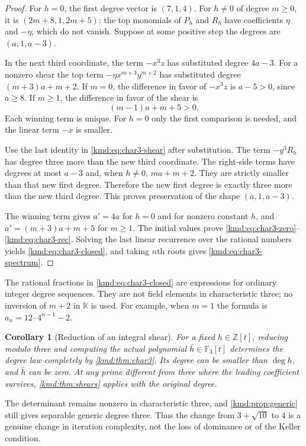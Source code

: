 \documentclass[11pt,a4paper]{article}
\numberwithin{equation}{section}
\newtheorem{corollary}[theorem]{Corollary}
\theoremstyle{definition}
\theoremstyle{remark}
\newcommand{\K}{\mathbb K}
\newcommand{\Z}{\mathbb Z}
\newcommand{\dd}{\operatorname{deg}}
\begin{document}
\begin{proof}
For $h=0$, the first degree vector is $(7,1,4)$. For $h\ne0$ of
degree $m\ge0$, it is $(2m+8,1,2m+5)$: the top monomials of
$P_h$ and $R_h$ have coefficients $\eta$ and $-\eta$, which do not
vanish. Suppose at some positive step the degrees are $(a,1,a-3)$.

In the next third coordinate, the term $-x^3z$ has substituted
degree $4a-3$. For a nonzero shear the top term
$-\eta x^{m+3}y^{m+2}$ has substituted degree
$(m+3)a+m+2$. If $m=0$, the difference in favor of $-x^3z$ is
$a-5>0$, since $a\ge8$. If $m\ge1$, the difference in favor of
the shear is
\[
 (m-1)a+m+5>0.
\]
Each winning term is unique. For $h=0$ only the first comparison is
needed, and the linear term $-x$ is smaller.

Use the last identity in \eqref{kmd:eq:char3-shear} after substitution.
The term $-y^3R_h$ has degree three more than the new third
coordinate. The right-side terms have degrees at most $a-3$ and,
when $h\ne0$, $ma+m+2$. They are strictly smaller than that new
first degree. Therefore the new first degree is exactly three more
than the new third degree. This proves preservation of the shape
$(a,1,a-3)$.

The winning term gives $a'=4a$ for $h=0$ and for nonzero constant
$h$, and $a'=(m+3)a+m+5$ for $m\ge1$. The initial values prove
\eqref{kmd:eq:char3-zero}--\eqref{kmd:eq:char3-rec}. Solving the last
linear recurrence over the rational numbers yields
\eqref{kmd:eq:char3-closed}, and taking $n$th roots gives
\eqref{kmd:eq:char3-spectrum}.
\end{proof}

The rational fractions in \eqref{kmd:eq:char3-closed} are expressions
for ordinary integer degree sequences. They are not field elements
in characteristic three; no inversion of $m+2$ in $\K$ is used.
For example, when $m=1$ the formula is $a_n=12\cdot4^{n-1}-2$.

\begin{corollary}[Reduction of an integral shear]
For a fixed $h\in\Z[t]$, reducing modulo three and computing the
actual polynomial $\bar h\in\mathbb F_3[t]$ determines the degree
law completely by \cref{kmd:thm:char3}. Its degree can be smaller than
$\dd h$, and $\bar h$ can be zero. At any prime different from
three where the leading coefficient survives, \cref{kmd:thm:shears}
applies with the original degree.
\end{corollary}

The determinant remains nonzero in characteristic three, and
\cref{kmd:prop:generic} still gives separable generic degree three.
Thus the change from $3+\sqrt{10}$ to $4$ is a genuine change in
iteration complexity, not the loss of dominance or of the Keller
condition.
\end{document}
